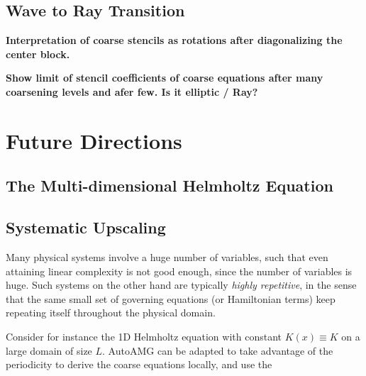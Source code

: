 \documentclass{article}
\begin{document}
\subsection{Wave to Ray Transition}
{\bf Interpretation of coarse stencils as rotations after diagonalizing the center block.}

{\bf Show limit of stencil coefficients of coarse equations after many coarsening levels and afer few. Is it elliptic / Ray?}

\section{Future Directions}
\label{future}

\subsection{The Multi-dimensional Helmholtz Equation}
\label{multidim}

\subsection{Systematic Upscaling}
\label{upscaling}
Many physical systems involve a huge number of variables, such that even attaining linear complexity is not good enough, since the number of variables is huge. Such systems on the other hand are typically \emph{highly repetitive}, in the sense that the same small set of governing equations (or Hamiltonian terms) keep repeating itself throughout the physical domain. 

Consider for instance the 1D Helmholtz equation with constant $K(x) \equiv K$ on a large domain of size $L$. AutoAMG can be adapted to take advantage of the periodicity to derive the coarse equations locally, and use the 
\end{document}
